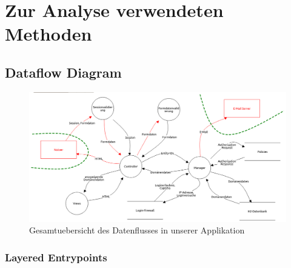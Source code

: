 \documentclass[12pt,DIV14,BCOR10mm,a4paper,twoside,parskip=half-,headsepline,headinclude,english,ngerman,bibliography=totocnumbered]{scrreprt}
\begin{document}
\tableofcontents  %

\printbibliography

\chapter{Zur Analyse verwendeten Methoden}
\section{Dataflow Diagram}

\begin{figure}[htbp]
  \hspace*{-1.75cm}
  \label{overview-dfd-pic}
  \includegraphics[width=1.25\linewidth]{resources/overview-dfd.jpg}
  \caption{Gesamtuebersicht des Datenflusses in unserer Applikation}
\end{figure}

\subsection{Layered Entrypoints}

\renewcommand{\labelenumi}{\arabic{enumi}}
\renewcommand{\labelenumii}{\arabic{enumii}}
\renewcommand{\labelenumiii}{\arabic{enumiii}}
\renewcommand{\labelenumvi}{\arabic{enumvi}}
\end{document}
